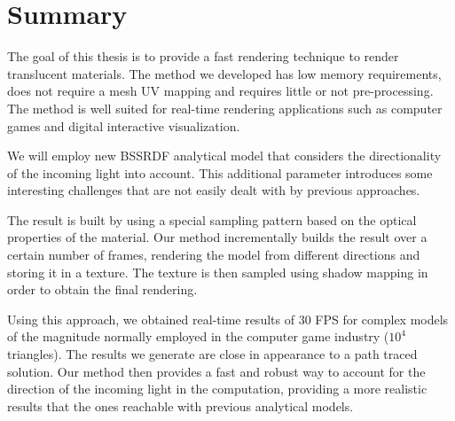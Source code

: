 \chapter{Summary}

The goal of this thesis is to provide a fast rendering technique to render translucent materials. The method we developed has low memory requirements, does not require a mesh UV mapping and requires little or not pre-processing. The method is well suited for real-time rendering applications such as computer games and digital interactive visualization. 

We will employ new BSSRDF analytical model that considers the directionality of the incoming light into account. This additional parameter introduces some interesting challenges that are not easily dealt with by previous approaches. 

The result is built by using a special sampling pattern based on the optical properties of the material. Our method incrementally builds the result over a certain number of frames, rendering the model from different directions and storing it in a texture. The texture is then sampled using shadow mapping in order to obtain the final rendering. 

Using this approach, we obtained real-time results of 30 FPS for complex models of the magnitude normally employed in the computer game industry ($10^4$ triangles). The results we generate are close in appearance to a path traced solution. Our method then provides a fast and robust way to account for the direction of the incoming light in the computation, providing a more realistic results that the ones reachable with previous analytical models. 